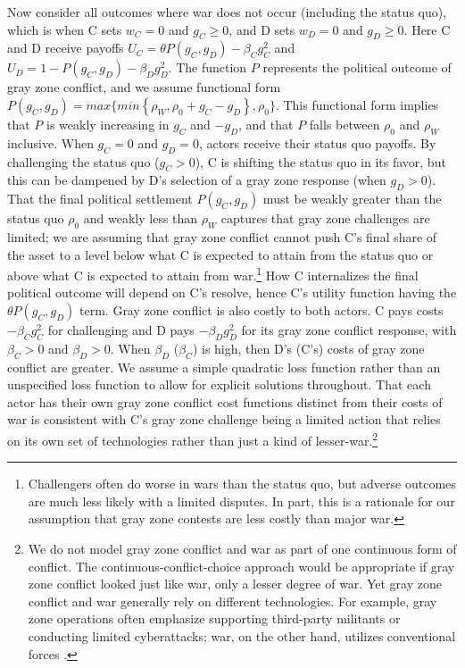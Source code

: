 \documentclass[11pt,letterpaper,pdftex,dvipsnames,table]{article}
\begin{document}
Now consider all outcomes where war does not occur (including the status quo), which is when C sets $w_{C}=0$ and $g_{C}\geq0$, and D sets $w_{D}=0$ and $g_{D}\geq0$. Here C and D receive payoffs $U_{C}=\theta P(g_{C},g_{D})-\beta_{C}g_{C}^{2}$ and $U_{D}=1-P(g_{C},g_{D})-\beta_{D}g_{D}^{2}$. The function $P$ represents the political outcome of gray zone conflict, and we assume functional form $P(g_{C},g_{D})=max\{min\left\{ \rho_W,\rho_{0}+g_{C}-g_{D}\right\} ,\rho_{0}\}$. This functional form implies that $P$ is weakly increasing in $g_{C}$ and $-g_{D}$, and that $P$ falls between $\rho_{0}$ and $\rho_W$ inclusive. When $g_{C}=0$ and $g_{D}=0$, actors receive their status quo payoffs. By challenging the status quo ($g_{C}>0$), C is shifting the status quo in its favor, but this can be dampened by D's selection of a gray zone response (when $g_{D}>0$). That the final political settlement $P(g_{C},g_{D})$ must be weakly greater than the status quo $\rho_{0}$ and weakly less than $\rho_W$ captures that gray zone challenges are limited; we are assuming that gray zone conflict cannot push C's final share of the asset to a level below what C is expected to attain from the status quo or above what C is expected to attain from war.\footnote{Challengers often do worse in wars than the status quo, but adverse outcomes are much less likely with a limited disputes. In part, this is a rationale for our assumption that gray zone contests are less costly than major war.} How C internalizes the final political outcome will depend on C's resolve, hence C's utility function having the $\theta P(g_{C},g_{D})$ term. Gray zone conflict is also costly to both actors. C pays costs $-\beta_{C}g_{C}^{2}$ for challenging and D pays $-\beta_{D}g_{D}^{2}$ for its gray zone conflict response, with  $\beta_{C}>0$ and $\beta_{D}>0$. When $\beta_{D}$ ($\beta_{C}$) is high, then D's (C's) costs of gray zone conflict are greater. We assume a simple quadratic loss function rather than an unspecified loss function to allow for explicit solutions throughout. That each actor has their own gray zone conflict cost functions distinct from their costs of war is consistent with  C's gray zone challenge being a limited action that relies on its own set of technologies rather than just a kind of lesser-war.\footnote{We do not model gray zone conflict and war as part of one continuous form of conflict. The continuous-conflict-choice approach would be appropriate if gray zone conflict looked just like war, only a lesser degree of war. Yet gray zone conflict and war generally rely on different technologies. For example, gray zone operations often emphasize supporting third-party militants or conducting limited cyberattacks; war, on the other hand, utilizes conventional forces \citep{mazarr_masteringgrayzone_2015, matisek_shadesgraydeterrence_2017, wirtz_lifegrayzone_2017}.}
 
\end{document}
